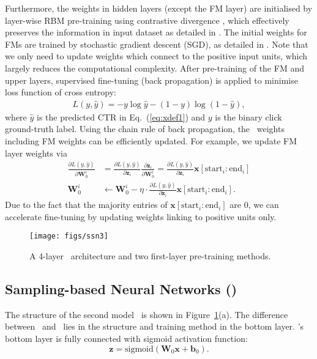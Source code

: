 \documentclass{llncs}
\newcommand{\bs}{\boldsymbol}
\newcommand{\sigmoid}{\text{sigmoid}}
\newcommand{\fmnn}{\text{FNN}}
\newcommand{\snn}{\text{SNN}}
\begin{document}
Furthermore, the weights in hidden layers (except the FM layer) are initialised by layer-wise RBM pre-training \cite{bengio2007greedy} using contrastive divergence \cite{hinton2002training}, which effectively preserves the information in input dataset as detailed in \cite{hinton2006reducing,hinton2010practical}.  The initial weights for FMs are trained by stochastic gradient descent (SGD), as detailed in \cite{rendle2012factorization}. Note that we only need to update weights which connect to the positive input units, which largely reduces the computational complexity. After pre-training of the FM and upper layers, supervised fine-tuning (back propagation) is applied to minimise loss function of cross entropy:
\begin{align}
L(y,\hat{y})= -y\log \hat{y} - (1-y)\log(1-\hat{y})  \label{eq:xdefloss},
\end{align}
where $\hat{y}$ is the predicted CTR in Eq.~(\ref{eq:xdef1}) and $y$ is the binary click ground-truth label. Using the chain rule of back propagation, the \fmnn~weights including FM weights can be efficiently updated. For example, we update FM layer weights via
\begin{align}
\frac{\partial L(y,\hat{y})}{\partial \bs{W}_{0}^{i}} &=  \frac{\partial L(y,\hat{y})}{\partial \bs{z}_i} \frac{\partial \bs{z}_i}{\partial \bs{W}_{0}^{i}} =\frac{\partial L(y,\hat{y})}{\partial \bs{z}_i} \bs{x}[\text{start}_i:\text{end}_i] \\
\bs{W}_{0}^{i} &\leftarrow \bs{W}_{0}^{i}-\eta \cdot \frac{\partial L(y,\hat{y})}{\partial \bs{z}_i} \bs{x}[\text{start}_i:\text{end}_i].  \label{eq:def_grad}
\end{align}
Due to the fact that the majority entries of $\bs{x}[\text{start}_i:\text{end}_i]$ are 0, we can accelerate fine-tuning by updating weights linking to positive units only.







\begin{figure}[t]
  \centering
  \vspace{-35pt}
  \texttt{[image: figs/ssn3]}\\
  \caption{A 4-layer \snn~architecture and two first-layer pre-training methods.}\label{fig:snn}
\end{figure}

\subsection{Sampling-based Neural Networks (\snn)}\label{sec:snn}
The structure of the second model \snn~is shown in Figure~\ref{fig:snn}(a). The difference between \snn~and \fmnn~lies in the structure and training method in the bottom layer. \snn's bottom layer is fully connected with sigmoid activation function:
\begin{equation}
\bs{z}=\sigmoid(\bs{W}_{0}\bs{x}+\bs{b}_{0}).   \label{eq:defmodtwo}
\end{equation}
\end{document}
